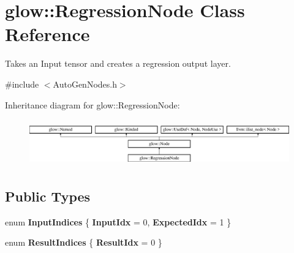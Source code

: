 \hypertarget{classglow_1_1_regression_node}{}\section{glow\+:\+:Regression\+Node Class Reference}
\label{classglow_1_1_regression_node}


Takes an Input tensor and creates a regression output layer.  




{\ttfamily \#include $<$Auto\+Gen\+Nodes.\+h$>$}

Inheritance diagram for glow\+:\+:Regression\+Node\+:\begin{figure}[H]
\begin{center}
\leavevmode
\includegraphics[height=2.028986cm]{classglow_1_1_regression_node}
\end{center}
\end{figure}
\subsection*{Public Types}
\begin{DoxyCompactItemize}
\item 
\mbox{\label{classglow_1_1_regression_node_a26d1dc4adc27c81fcf94a1f4ac53d99a}} 
enum {\bfseries Input\+Indices} \{ {\bfseries Input\+Idx} = 0, 
{\bfseries Expected\+Idx} = 1
 \}
\item 
\mbox{\label{classglow_1_1_regression_node_ab1e14f0f04e459b5a919697b9ba63399}} 
enum {\bfseries Result\+Indices} \{ {\bfseries Result\+Idx} = 0
 \}
\end{DoxyCompactItemize}

